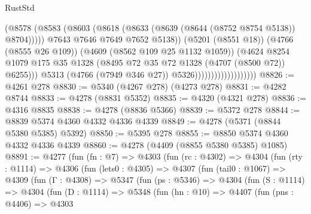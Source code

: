 \begin{lexlean}{RustStd}
\begin{coremodule}
{\begin{coremodule}
{{{{{{{{{{{{{{{{{{{{{{{{{{{{{{{{{{{                                              (@8578
                                                (@8583
                                                  (@8603
                                                    (@8618
                                                      (@8633
                                                        (@8639
                                                          (@8644 (@8752 @8754 @5138))
                                                          @8704)))))
                                                @7643
                                                @7646
                                                @7649
                                                @7652
                                                @5138))
                                            (@5201 (@8551 @18))
                                            (@4766 (@8555 @26 @109))
                                            (@4609 (@8562 @109 @25 @1132 @1059))
                                            (@4624
                                              @8254
                                              @1079
                                              @175
                                              @35
                                              @1328
                                              (@8495 @72 @35 @72 @1328 (@4707 (@8500 @72)) @6255)))
                                          @5313
                                          (@4766 (@7949 @346 @27))
                                          @5326)))))))))))))))))))
@8826 := @4261 @278
@8830 := @5340 (@4267 @278) (@4273 @278)
@8831 := @4282 @8744
@8833 := @4278 (@8831 @5352)
@8835 := @4320 (@4321 @278)
@8836 := @4316 @8835
@8838 := @4278 (@8836 @5366)
@8839 := @5372 @278
@8844 := @8839 @5374 @4360 @4332 @4336 @4339
@8849 := @4278 (@5371 (@8844 @5380 @5385) @5392)
@8850 := @5395 @278
@8855 := @8850 @5374 @4360 @4332 @4336 @4339
@8860 := @4278 (@4409 (@8855 @5380 @5385) @1085)
@8891 := @4277
    (fun (fn : @7) =>
    @4303
      (fun (rc : @4302) =>
      @4304
        (fun (rty : @1114) =>
        @4306
          (fun (lets0 : @4305) =>
          @4307
            (fun (tail0 : @1067) =>
            @4309
              (fun (Γ : @4308) =>
              @5347
                (fun (ps : @5346) =>
                @4304
                  (fun (S : @1114) =>
                  @4304
                    (fun (D : @1114) =>
                    @5348
                      (fun (hn : @10) =>
                      @4407
                        (fun (pns : @4406) =>
                        @4303
}}}}}}}}}}}}}}}}}}}}}}}}}}}}}}}}}}}
\end{coremodule}}
\end{coremodule}
\end{lexlean}
